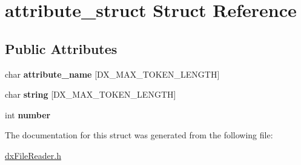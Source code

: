 \hypertarget{structattribute__struct}{
\section{attribute\_\-struct Struct Reference}
\label{structattribute__struct}
}
\subsection*{Public Attributes}
\begin{DoxyCompactItemize}
\item 
\hypertarget{structattribute__struct_a2e66defade699a734be993ad607fc4d0}{
char {\bfseries attribute\_\-name} \mbox{[}DX\_\-MAX\_\-TOKEN\_\-LENGTH\mbox{]}}
\label{structattribute__struct_a2e66defade699a734be993ad607fc4d0}

\item 
\hypertarget{structattribute__struct_af3911240f6243764b0b5d1dbd5817192}{
char {\bfseries string} \mbox{[}DX\_\-MAX\_\-TOKEN\_\-LENGTH\mbox{]}}
\label{structattribute__struct_af3911240f6243764b0b5d1dbd5817192}

\item 
\hypertarget{structattribute__struct_a64523890198f9450452b5a8c95796e43}{
int {\bfseries number}}
\label{structattribute__struct_a64523890198f9450452b5a8c95796e43}

\end{DoxyCompactItemize}


The documentation for this struct was generated from the following file:\begin{DoxyCompactItemize}
\item 
\hyperlink{dxFileReader_8h}{dxFileReader.h}\end{DoxyCompactItemize}
